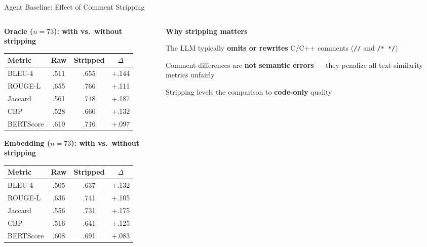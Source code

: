 \documentclass[aspectratio=169,10pt]{beamer}
\newcommand{\chit}[1]{\cellcolor{hit!30} #1}
\begin{document}
\begin{frame}{Agent Baseline: Effect of Comment Stripping}
\begin{columns}[T]
\begin{column}{0.48\textwidth}

  \textbf{Oracle ($n{=}73$): with vs.\ without stripping}

  \vspace{0.4em}
  {\scriptsize
  \renewcommand{\arraystretch}{1.35}
  \begin{tabular}{l c c c}
    \toprule
    \textbf{Metric} & \textbf{Raw} & \textbf{Stripped} & \textbf{$\Delta$} \\
    \midrule
    BLEU-4      & .511 & \chit{.655} & \chit{+.144} \\
    ROUGE-L     & .655 & \chit{.766} & \chit{+.111} \\
    Jaccard     & .561 & \chit{.748} & \chit{+.187} \\
    CBP         & .528 & \chit{.660} & \chit{+.132} \\
    BERTScore   & .619 & \chit{.716} & \chit{+.097} \\
    \bottomrule
  \end{tabular}}

  \vspace{0.6em}
  \textbf{Embedding ($n{=}73$): with vs.\ without stripping}

  \vspace{0.4em}
  {\scriptsize
  \renewcommand{\arraystretch}{1.35}
  \begin{tabular}{l c c c}
    \toprule
    \textbf{Metric} & \textbf{Raw} & \textbf{Stripped} & \textbf{$\Delta$} \\
    \midrule
    BLEU-4      & .505 & \chit{.637} & \chit{+.132} \\
    ROUGE-L     & .636 & \chit{.741} & \chit{+.105} \\
    Jaccard     & .556 & \chit{.731} & \chit{+.175} \\
    CBP         & .516 & \chit{.641} & \chit{+.125} \\
    BERTScore   & .608 & \chit{.691} & \chit{+.083} \\
    \bottomrule
  \end{tabular}}

\end{column}
\begin{column}{0.48\textwidth}

  \textbf{Why stripping matters}

  \vspace{0.4em}
  \begin{itemize}\setlength{\itemsep}{3pt}
    {\scriptsize
    \item The LLM typically \textbf{omits or rewrites} C/C++ comments
          (\texttt{//} and \texttt{/* */})
    \item Comment differences are \textbf{not semantic errors} ---
          they penalize all text-similarity metrics unfairly
    \item Stripping levels the comparison to \textbf{code-only} quality}
  \end{itemize}


\end{column}
\end{columns}
\end{frame}
\end{document}

